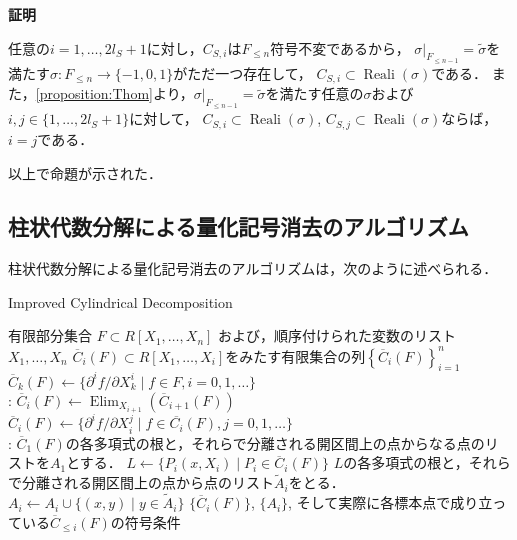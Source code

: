 \documentclass[uplatex, dvipdfmx]{jsarticle}
\makeatletter
\numberwithin{equation}{section}
\renewenvironment{proof}[1][\proofname]{\par
  \pushQED{\qed}%
  \normalfont \topsep6\p@\@plus6\p@\relax
  \trivlist
  \item\relax
  {\bfseries
  #1\@addpunct{.}}\hspace\labelsep\ignorespaces
}{
  \popQED\endtrivlist\@endpefalse
}
\newcommand{\map}[3]{{#1}\colon{#2}\rightarrow{#3}}
\DeclareMathOperator{\Elim}{Elim}
\DeclareMathOperator{\Reali}{Reali}
\theoremstyle{definition}
\renewcommand{\proofname}{\textbf{証明}}
\makeatother
\begin{document}
\begin{proof}
     任意の$i=1, \dots, 2l_S+1$に対し，$C_{S,i}$は$F_{\leq n}$符号不変であるから，
     $\sigma|_{F_{\leq n-1}} = \widetilde{\sigma}$を満たす$\map{\sigma}{F_{\leq n}}{\{-1,0,1\}}$がただ一つ存在して，
     $C_{S,i} \subset \Reali(\sigma)$である．
     また，\cref{proposition:Thom}より，$\sigma|_{F_{\leq n-1}} = \widetilde{\sigma}$を満たす任意の$\sigma$および
     $i,j \in \{1, \dots, 2l_S + 1\}$に対して，
     $C_{S,i} \subset \Reali(\sigma)$, $C_{S,j} \subset \Reali(\sigma)$ならば，$i=j$である．

     以上で命題が示された．
\end{proof}

\subsection{柱状代数分解による量化記号消去のアルゴリズム}

柱状代数分解による量化記号消去のアルゴリズムは，次のように述べられる．

\begin{algorithm}
     \caption{Improved Cylindrical Decomposition}
     \begin{algorithmic}[1]
          \REQUIRE 
               有限部分集合
               $F \subset R[X_1, \dots, X_n]$
               および，順序付けられた変数のリスト$X_1, \dots, X_n$
          \ENSURE
               $\overline{C}_i(F) \subset R[X_1, \dots, X_i]$をみたす有限集合の列$\left\{\overline{C}_i(F)\right\}_{i=1}^n$
          \STATE $\overline{C}_k(F)\leftarrow \{\partial^i f/ \partial X_k^i \mid f \in F, i=0,1,\dots \}$
          \\ :
               \STATE $\overline{C}_i(F) \leftarrow \Elim_{X_{i+1}}(\overline{C}_{i+1}(F))$
               \STATE $\overline{C}_i(F) \leftarrow \{ \partial^i f/ \partial X_i^j \mid f \in  \overline{C_i}(F), j=0,1, \dots\}$
          \ENDFOR
          \\ :
          \STATE $\overline{C}_1(F)$の各多項式の根と，それらで分離される開区間上の点からなる点のリストを$A_1$とする．
                    \STATE $L \leftarrow \{P_i(x, X_i) \mid P_i \in \overline{C}_i(F)\}$
                    \STATE $L$の各多項式の根と，それらで分離される開区間上の点から点のリスト$\widetilde{A}_i$をとる．
                    \STATE $A_i \leftarrow A_i \cup \{(x, y)\mid y \in \widetilde{A}_i\}$
               \ENDFOR
          \ENDFOR
          \RETURN $\{\overline{C}_i(F)\}$, $\{A_i\}$, そして実際に各標本点で成り立っている$\overline{C}_{\leq i}(F)$の符号条件
     \end{algorithmic}
\end{algorithm}
\end{document}
